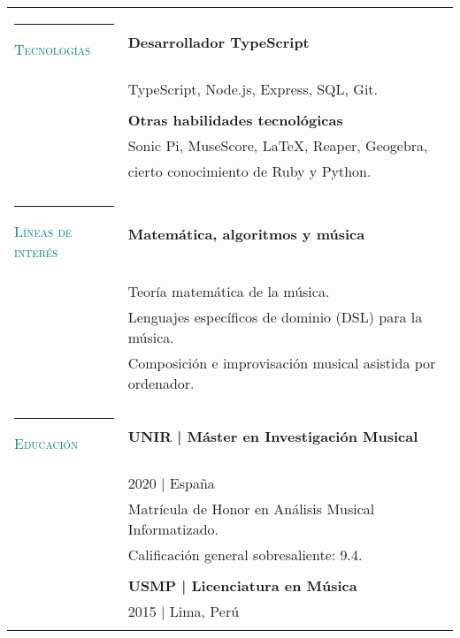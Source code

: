 \documentclass[letterpaper,10pt,oneside]{article}
\begin{document}
\begin{tabular}{@{}l l}

    \textcolor{teal}{\rule{0.4em}{7pt}}
    \scshape{\textcolor{teal}{Tecnologías}}  & \textbf{Desarrollador TypeScript} \\

    & TypeScript, Node.js, Express,  SQL, Git. \\
    & \\

    & \textbf{Otras habilidades tecnológicas} \\
    & Sonic Pi, MuseScore, \LaTeX, Reaper, Geogebra, \\
    & cierto conocimiento de Ruby y Python. \\
    & \\

    \textcolor{teal}{\rule{0.4em}{7pt}}
    \scshape{\textcolor{teal}{Líneas de interés}}
     & \textbf{Matemática, algoritmos y música} \\
    & Teoría matemática de la música. \\
    & Lenguajes específicos de dominio (DSL) para la música. \\
    & Composición e improvisación musical asistida por ordenador.\\
    & \\

    \textcolor{teal}{\rule{0.4em}{7pt}}
    \scshape{\textcolor{teal}{Educación}}
    & \textbf{UNIR |  Máster en Investigación Musical} \\
     & 2020 | España \\
     & Matrícula de Honor en Análisis Musical Informatizado.  \\
     & Calificación general sobresaliente: 9.4. \\
     & \\
     & \textbf{USMP | Licenciatura en Música} \\
     &  2015 | Lima, Perú  \\
     & \\







\end{tabular}
\end{document}
